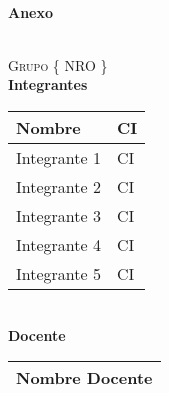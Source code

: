 \documentclass[10pt,spanish]{article}
\newcommand{\Titulo}{Anexo}
\newcommand{\Grupo}{Grupo \{ NRO \}}
\newcommand{\NomIntegrUno}{Integrante 1}
\newcommand{\CiIntegrUno}{CI}
\newcommand{\NomIntegrDos}{Integrante 2}
\newcommand{\CiIntegrDos}{CI}
\newcommand{\NomIntegrTres}{Integrante 3}
\newcommand{\CiIntegrTres}{CI}
\newcommand{\NomIntegrCuatro}{Integrante 4}
\newcommand{\CiIntegrCuatro}{CI}
\newcommand{\NomIntegrCinco}{Integrante 5}
\newcommand{\CiIntegrCinco}{CI}
\newcommand{\NomDocente}{Nombre Docente}
\numberwithin{figure}{section} %
\begin{document}
\begin{center}
\vspace*{1cm}																		%
\HRule \\[0.4cm]																	%
{ \huge \bfseries \Titulo}\\[0.3cm]	%
\HRule \\[4cm]																	%
\begin{minipage}{0.8\textwidth}													%
\begin{flushleft} \large															%
\textsc{\LARGE \Grupo}\\
\LARGE{\textbf{Integrantes}}\\	
\Large
\vspace{0.3cm}
  \begin{tabular}{ | p{10cm} | p{2.5cm} | }
    \hline
    \textbf{Nombre} & \textbf{CI} \\ \hline
    \NomIntegrUno & \CiIntegrUno \\ \hline
    \NomIntegrDos & \CiIntegrDos  \\ \hline 
    \NomIntegrTres & \CiIntegrTres \\ \hline
    \NomIntegrCuatro & \CiIntegrCuatro \\ \hline
    \NomIntegrCinco & \CiIntegrCinco \\ \hline
  \end{tabular}\\[0.5cm]
\LARGE{\textbf{Docente}}\\	
\Large
\vspace{0.3cm}
\begin{tabular}{ | p{10cm} |}
    \hline
     \NomDocente \\ 
     \hline
  \end{tabular}
\end{flushleft}																		%
\end{minipage}		
\begin{minipage}{0.52\textwidth}		
\vspace{-0.6cm}											%
\begin{flushright} \large															%
\emph{} \\																	%
\end{flushright}																	%
\end{minipage}	
\begin{flushleft}
 	
\end{flushleft}
 		\flushleft{\textbf{}	}\\																		%
\end{center}							 											
																					
\end{document}

